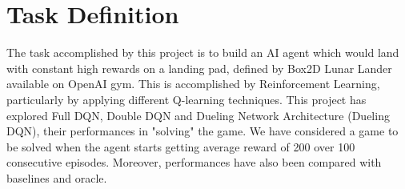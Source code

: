 \section{Task Definition}
\label{intro}

The task accomplished by this project is to build an AI agent which would land with constant high rewards on a landing pad, defined by Box2D Lunar Lander available on OpenAI gym. This is accomplished by Reinforcement Learning, particularly by applying different Q-learning techniques. This project has explored Full DQN, Double DQN and Dueling Network Architecture (Dueling DQN), their performances in "solving" the game. We have considered a game to be solved when the agent starts getting average reward of 200 over 100 consecutive episodes. Moreover, performances have also been compared with baselines and oracle.

